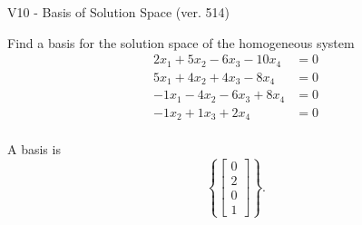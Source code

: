 \begin{exercise}
  \begin{exerciseTitle}V10 - Basis of Solution Space (ver. 514)\end{exerciseTitle}
  \begin{exerciseStatement}
    Find a basis for the solution space of the homogeneous system 
\begin{align*}
 2 x_ 1 + 5 x_ 2 -6 x_ 3 -10 x_ 4 &= 0  \\ 
  5 x_ 1 + 4 x_ 2 + 4 x_ 3 -8 x_ 4 &= 0  \\ 
  -1 x_ 1 -4 x_ 2 -6 x_ 3 + 8 x_ 4 &= 0  \\ 
  -1 x_ 2 + 1 x_ 3 + 2 x_ 4 &= 0  \\ 
 \end{align*}


 
  \end{exerciseStatement}

  \begin{exerciseAnswer}
   A basis is   
\[\left\{\left[\begin{array}{c}
0 \\
2 \\
0 \\
1
\end{array}\right]\right\}.\]

  


  \end{exerciseAnswer}
\end{exercise}